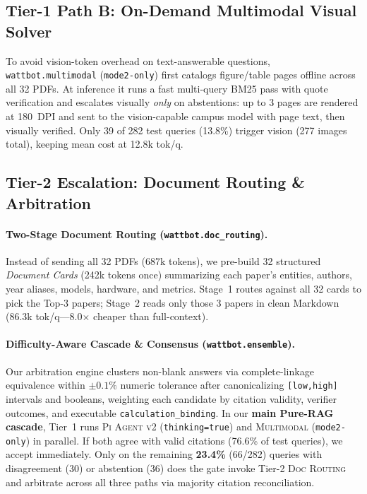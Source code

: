 \documentclass[sigconf,nonacm]{acmart}
\newcommand{\code}[1]{\texttt{\small #1}}
\begin{document}
\subsection{Tier-1 Path B: On-Demand Multimodal Visual Solver}
\label{sec:multimodal}

To avoid vision-token overhead on text-answerable questions, \code{wattbot.multimodal} (\code{mode2-only}) first catalogs figure/table pages offline across all 32 PDFs. At inference it runs a fast multi-query BM25 pass with quote verification and escalates visually \emph{only} on abstentions: up to 3 pages are rendered at 180~DPI and sent to the vision-capable campus model with page text, then visually verified. Only 39 of 282 test queries (13.8\%) trigger vision (277 images total), keeping mean cost at 12.8k tok/q.

\subsection{Tier-2 Escalation: Document Routing \& Arbitration}
\label{sec:cascade}

\paragraph{Two-Stage Document Routing (\code{wattbot.doc\_routing}).}
Instead of sending all 32 PDFs (687k tokens), we pre-build 32 structured \emph{Document Cards} (242k tokens once) summarizing each paper's entities, authors, year aliases, models, hardware, and metrics. Stage~1 routes against all 32 cards to pick the Top-3 papers; Stage~2 reads only those 3 papers in clean Markdown (86.3k tok/q---8.0$\times$ cheaper than full-context).

\paragraph{Difficulty-Aware Cascade \& Consensus (\code{wattbot.ensemble}).}
Our arbitration engine clusters non-blank answers via complete-linkage equivalence within $\pm 0.1\%$ numeric tolerance after canonicalizing \code{[low,high]} intervals and booleans, weighting each candidate by citation validity, verifier outcomes, and executable \code{calculation\_binding}.
In our \textbf{main Pure-RAG cascade}, Tier~1 runs \textsc{Pi Agent v2} (\code{thinking=true}) and \textsc{Multimodal} (\code{mode2-only}) in parallel. If both agree with valid citations (76.6\% of test queries), we accept immediately. Only on the remaining \textbf{23.4\%} (66/282) queries with disagreement (30) or abstention (36) does the gate invoke Tier-2 \textsc{Doc Routing} and arbitrate across all three paths via majority citation reconciliation.
\end{document}
